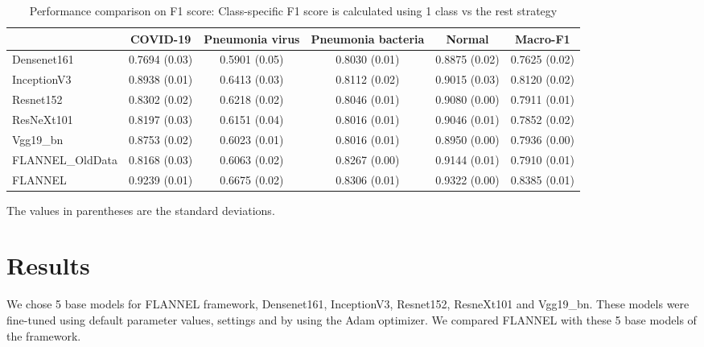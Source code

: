 \documentclass{sigkddExp}
\begin{document}
\begin{table}
    \centering
    \caption{Performance comparison on F1 score: Class-specific F1 score is calculated using 1 class vs the rest strategy}
    \label{table:resultstats}
    \begin{tabular}{ lccccc } \hline
                         & COVID-19      & Pneumonia virus & Pneumonia bacteria &
        Normal           & Macro-F1                                               \\ \hline

        Densenet161      & 0.7694 (0.03) & 0.5901 (0.05)   & 0.8030 (0.01)      &
        0.8875 (0.02)    & 0.7625 (0.02)                                          \\
        InceptionV3      & 0.8938 (0.01) & 0.6413 (0.03)   & 0.8112 (0.02)      &
        0.9015 (0.03)    & 0.8120 (0.02)                                          \\
        Resnet152        & 0.8302 (0.02) & 0.6218 (0.02)   & 0.8046 (0.01)      &
        0.9080 (0.00)    & 0.7911 (0.01)                                          \\
        ResNeXt101       & 0.8197 (0.03) & 0.6151 (0.04)   & 0.8016 (0.01)      &
        0.9046 (0.01)    & 0.7852 (0.02)                                          \\
        Vgg19\_bn        & 0.8753 (0.02) & 0.6023 (0.01)   & 0.8016 (0.01)      &
        0.8950 (0.00)    & 0.7936 (0.00)                                          \\
        FLANNEL\_OldData & 0.8168 (0.03) & 0.6063 (0.02)   & 0.8267 (0.00)      &
        0.9144 (0.01)    & 0.7910 (0.01)                                          \\
        FLANNEL          & 0.9239 (0.01) & 0.6675 (0.02)   & 0.8306 (0.01)      &
        0.9322 (0.00)    & 0.8385 (0.01)                                          \\ \hline
    \end{tabular}\par
    \bigskip
    The values in parentheses are the standard deviations.
\end{table}

\section{Results}

We chose 5 base models for FLANNEL framework, Densenet161, InceptionV3,
Resnet152, ResneXt101 and Vgg19\_bn. These models were fine-tuned using default
parameter values, settings and by using the Adam optimizer. We compared FLANNEL
with these 5 base models of the framework.
\end{document}

